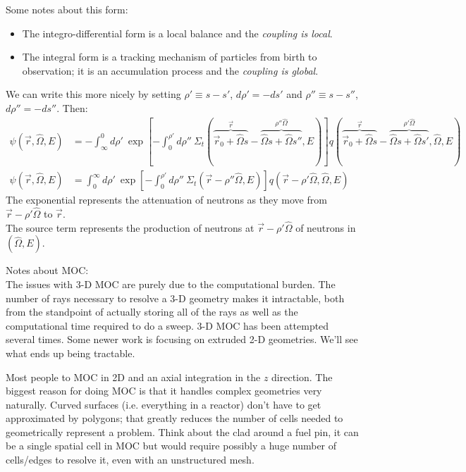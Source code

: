 \documentclass[12pt]{article}
\newcommand{\rvec}{\ensuremath{\vec{r}}}
\newcommand{\vOmega}{\ensuremath{\hat{\Omega}}}
\begin{document}
Some notes about this form:
\begin{itemize}
\item The integro-differential form is a local balance and the \textit{coupling is local}.
\item The integral form is a tracking mechanism of particles from birth to observation; it is an accumulation process and the \textit{coupling is global}. 
\end{itemize}
%
We can write this more nicely by setting $\rho' \equiv s-s'$, $d\rho' = -ds'$ and  $\rho'' \equiv s-s''$, $d\rho'' = -ds''$. Then:
\begin{align*}
\psi(\rvec, \vOmega, E) &= -\int_{\infty}^0 d\rho' \: \exp[-\int_0^{\rho'} d\rho'' \: \Sigma_t(\overbrace{\rvec_0 + \vOmega s}^{\vec{r}} - \overbrace{\vOmega s + \vOmega s''}^{\rho''\vOmega}, E)]q(\overbrace{\rvec_0 + \vOmega s}^{\vec{r}} - \overbrace{\vOmega s + \vOmega s'}^{\rho'\vOmega}, \vOmega, E) \\
\psi(\rvec, \vOmega, E) &=\int_0^{\infty} d\rho' \:\exp[-\int_0^{\rho'} d\rho'' \: \Sigma_t(\rvec-\rho''\vOmega,E)]q(\rvec-\rho'\vOmega,\vOmega,E)
\end{align*}
%
The exponential represents the attenuation of neutrons as they move from $\rvec-\rho'\vOmega$ to $\rvec$. \\
The source term represents the production of neutrons at $\rvec-\rho'\vOmega$ of neutrons in $(\vOmega, E)$.


Notes about MOC:\\
The issues with 3-D MOC are purely due to the computational burden.  The number of rays necessary to resolve a 3-D geometry makes it intractable, both from the standpoint of actually storing all of the rays as well as the computational time required to do a sweep.  3-D MOC has been attempted several times. Some newer work is focusing on extruded 2-D geometries. We'll see what ends up being tractable.

Most people to MOC in 2D and an axial integration in the $z$ direction. The biggest reason for doing MOC is that it handles complex geometries very naturally.  Curved surfaces (i.e. everything in a reactor) don't have to get approximated by polygons; that greatly reduces the number of cells needed to geometrically represent a problem.  Think about the clad around a fuel pin, it can be a single spatial cell in MOC but would require possibly a huge number of cells/edges to resolve it, even with an unstructured mesh.
\end{document}
